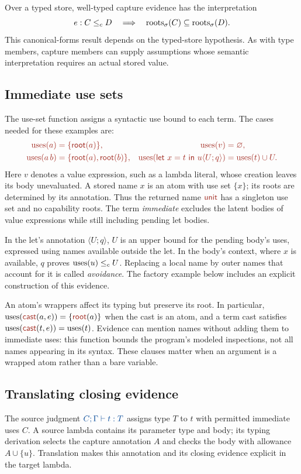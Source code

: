 Over a typed store, well-typed capture evidence has the interpretation
\[
  e:C\le_c D\quad\Longrightarrow\quad
  \operatorname{roots}_{\sigma}(C)\subseteq\operatorname{roots}_{\sigma}(D).
\]
This canonical-forms result depends on the typed-store hypothesis.
As with type members, capture members can supply assumptions whose
semantic interpretation requires an actual stored value.

\subsection*{Immediate use sets}
The use-set function assigns a syntactic use bound to each term.
The cases needed for these examples are:
\[
\tgt{\begin{aligned}
\uses{a}&=\{\ev{root}(a)\},& \uses{v}&=\varnothing,\\
 \uses{a\,b}&=\{\ev{root}(a),\ev{root}(b)\},&
 \uses{\ev{let}\ x=t\ \ev{in}\ u\langle U;q\rangle}
   &=\uses{t}\cup U.
\end{aligned}}
\]
Here $v$ denotes a value expression, such as a lambda literal, whose
creation leaves its body unevaluated. A stored name $x$ is an atom with
use set $\{x\}$; its roots are determined by its annotation. Thus the
returned name $\ev{unit}$ has a singleton use set and no capability
roots. The term \emph{immediate} excludes the latent bodies of value
expressions while still including pending let bodies.

In the let's annotation $\langle U;q\rangle$, $U$ is an upper bound
for the pending body's uses, expressed using names available outside
the let. In the body's context, where $x$ is available, $q$ proves
$\operatorname{uses}(u)\le_c U$. Replacing a local name by outer names that account
for it is called \emph{avoidance}. The factory example below includes
an explicit construction of this evidence.

An atom's wrappers affect its typing but preserve its root. In particular,
$\uses{\cast{a}{e}}=\{\ev{root}(a)\}$ when the cast is an atom,
and a term cast satisfies $\uses{\cast{t}{e}}=\uses{t}$.
Evidence can mention names without adding them to immediate uses:
this function bounds the program's modeled inspections, not all names
appearing in its syntax. These clauses matter when an argument is a
wrapped atom rather than a bare variable.

\subsection*{Translating closing evidence}
The source judgment $\src{C;\Gamma\vdash t:T}$ assigns type $T$ to $t$
with permitted immediate uses $C$. A source lambda contains its parameter
type and body; its typing derivation selects the capture annotation $A$
and checks the body with allowance $A\cup\{u\}$. Translation makes this
annotation and its closing evidence explicit in the target lambda.


